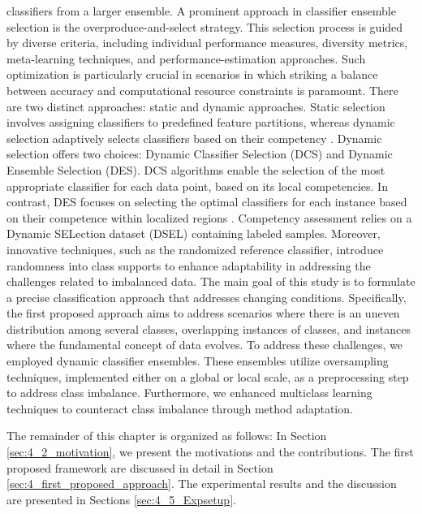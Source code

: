   classifiers from a larger ensemble. A prominent approach in classifier ensemble selection is the overproduce-and-select strategy. This
  selection process is guided by diverse criteria, including individual performance measures, diversity metrics, meta-learning techniques,
  and performance-estimation approaches. Such optimization is particularly crucial in scenarios in which striking a balance between
  accuracy and computational resource constraints is paramount. There are two distinct approaches: static and dynamic approaches.
  Static selection involves assigning classifiers to predefined feature partitions, whereas dynamic selection adaptively selects classifiers
  based on their competency \cite{lysiak2014optimal}. Dynamic selection offers two choices: Dynamic Classifier Selection (DCS) and Dynamic Ensemble
  Selection (DES). DCS algorithms enable the selection of the most appropriate classifier for each data point, based on its local competencies. In contrast, DES focuses on selecting the optimal classifiers for each instance based on their competence within localized
  regions \cite{cruz2017meta, widmer1996learning, lu2016concept}. Competency assessment relies on a Dynamic SELection dataset (DSEL) containing labeled samples. Moreover,
  innovative techniques, such as the randomized reference classifier, introduce randomness into class supports to enhance adaptability
  in addressing the challenges related to imbalanced data.
  The main goal of this study is to formulate a precise classification approach that addresses changing conditions. Specifically, the
  first proposed approach aims to address scenarios where there is an uneven distribution among several classes, overlapping instances of
  classes, and instances where the fundamental concept of data evolves. To address these challenges, we employed dynamic classifier
  ensembles. These ensembles utilize oversampling techniques, implemented either on a global or local scale, as a preprocessing step to
  address class imbalance. Furthermore, we enhanced multiclass learning techniques to counteract class imbalance through method
  adaptation. 
  
  The remainder of this chapter is organized as follows: In Section \ref{sec:4_2_motivation}, we present the motivations and the contributions. The first proposed framework are discussed in detail in Section \ref{sec:4_first_proposed_approach}. The  experimental results and the discussion are presented in Sections \ref{sec:4_5_Expsetup}.
  
  
